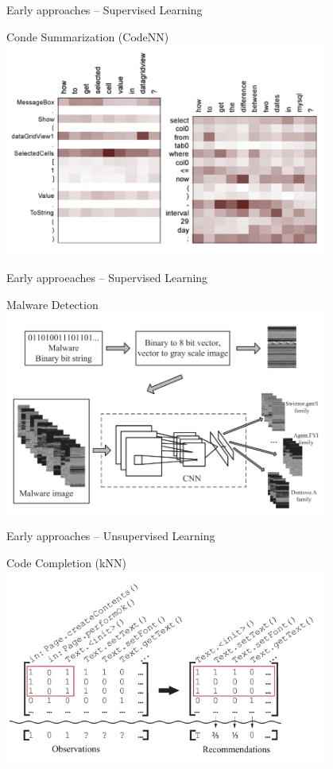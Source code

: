 \documentclass[presentation, 10pt]{beamer}\mode<presentation>{\usetheme{AMSBolognaFC}}
\begin{document}
\begin{frame}{Early approaches -- Supervised Learning}
\begin{exampleblock}{Conde Summarization (CodeNN)~\cite{DBLP:conf/acl/IyerKCZ16}}
\centering
\includegraphics[width=0.8\textwidth]{img/codenn.png}
\end{exampleblock}
\end{frame}
\begin{frame}{Early approeaches -- Supervised Learning}
\begin{exampleblock}{Malware Detection~\cite{DBLP:journals/tii/CuiXCCWC18}}
\centering
\includegraphics[width=0.8\textwidth]{img/malware-detection.png}
\end{exampleblock}
\end{frame}
\begin{frame}{Early approaches -- Unsupervised Learning}
\begin{exampleblock}{Code Completion (kNN)~\cite{}}
\centering
\includegraphics[width=0.8\textwidth]{img/code-completions.png}
\end{exampleblock}
\end{frame}
\end{document}
